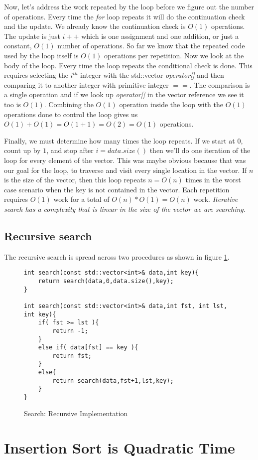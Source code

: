 \documentclass[]{tufte-handout}
\begin{document}
Now, let's address the work repeated by the loop before we figure out the number of operations.  Every time the \textit{for} loop repeats it will do the continuation check and the update.  We already know the continuation check is $O(1)$ operations. The update is just $i++$ which is one assignment and one addition, or just a constant, $O(1)$ number of operations. So far we know that the repeated code used by the loop itself is $O(1)$ operations per repetition. Now we look at the body of the loop. Every time the loop repeats the conditional check is done. This requires selecting the $i^{th}$ integer with the std::vector \textit{operator[]} and then comparing it to another integer with primitive integer $==$.  The comparison is a single operation and if we look up \textit{operator[]} in the vector reference we see it too is $O(1)$. Combining the $O(1)$ operation inside the loop with the $O(1)$ operations done to control the loop gives us $O(1)+O(1)=O(1 + 1)=O(2)=O(1)$ operations. 

Finally, we must determine how many times the loop repeats. If we start at $0$, count up by $1$, and stop after $i = data.size()$ then we'll do one iteration of the loop for every element of the vector. This was maybe obvious because that was our goal for the loop, to traverse and visit every single location in the vector. If $n$ is the size of the vector, then this loop repeats $n = O(n)$ times in the worst case scenario when the key is not contained in the vector. Each repetition requires $O(1)$ work for a total of $O(n)*O(1) = O(n)$ work. \textit{Iterative search has a complexity that is linear in the size of the vector we are searching.}

\subsection{Recursive search}

The recursive search is spread across two procedures as shown in figure \ref{code:searchrec}. 

\begin{figure}[htpb!]
\begin{lstlisting}
int search(const std::vector<int>& data,int key){
	return search(data,0,data.size(),key);
}

int search(const std::vector<int>& data,int fst, int lst, int key){
	if( fst >= lst ){
		return -1;
	}
	else if( data[fst] == key ){
		return fst;
	}
	else{
		return search(data,fst+1,lst,key);
	}
}
\end{lstlisting}
\label{code:searchrec}
\caption{Search: Recursive Implementation} 
\end{figure}



\section{Insertion Sort is Quadratic Time}
\end{document}
